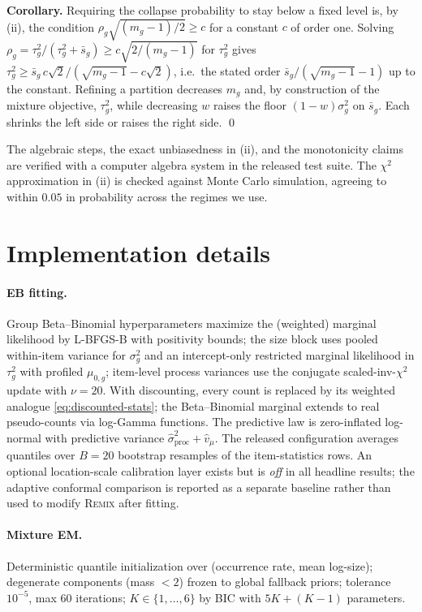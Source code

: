 \documentclass[twocolumn,10pt]{article}
\theoremstyle{definition}
\newcommand{\REMIX}{\textsc{Remix}}
\begin{document}
\textbf{Corollary.} Requiring the collapse probability to stay below a
fixed level is, by (ii), the condition $\rho_g\sqrt{(m_g-1)/2}\ge c$ for
a constant $c$ of order one. Solving
$\rho_g=\tau_g^2/(\tau_g^2+\bar s_g)\ge c\sqrt{2/(m_g-1)}$ for
$\tau_g^2$ gives
$\tau_g^2\ge\bar s_g\,c\sqrt{2}/(\sqrt{m_g-1}-c\sqrt2)$, i.e.\ the
stated order $\bar s_g/(\sqrt{m_g-1}-1)$ up to the constant. Refining a
partition decreases $m_g$ and, by construction of the mixture objective,
$\tau_g^2$, while decreasing $w$ raises the floor $(1-w)\sigma_g^2$ on
$\bar s_g$. Each shrinks the left side or raises the right side. \qed

The algebraic steps, the exact unbiasedness in (ii), and the monotonicity
claims are verified with a computer algebra system in
the released test suite. The $\chi^2$ approximation in (ii) is checked
against Monte Carlo simulation, agreeing to within $0.05$ in probability
across the regimes we use.

\section{Implementation details}\label{app:implementation}

\paragraph{EB fitting.} Group Beta--Binomial hyperparameters maximize the
(weighted) marginal likelihood by L-BFGS-B with positivity bounds; the
size block uses pooled within-item variance for $\sigma^2_g$ and an
intercept-only restricted marginal likelihood in $\tau^2_g$ with profiled
$\mu_{0,g}$; item-level process variances use the conjugate
scaled-inv-$\chi^2$ update with $\nu{=}20$. With discounting, every count
is replaced by its weighted analogue \eqref{eq:discounted-stats}; the
Beta--Binomial marginal extends to real pseudo-counts via log-Gamma
functions. The predictive law is zero-inflated log-normal with predictive
variance $\hat\sigma^2_{\mathrm{proc}}+\hat v_\mu$. The released
configuration averages quantiles over $B{=}20$ bootstrap resamples of the
item-statistics rows. An optional location-scale calibration layer exists
but is \emph{off} in all headline results; the adaptive conformal
comparison is reported as a separate baseline rather than used to modify
\REMIX{} after fitting.

\paragraph{Mixture EM.} Deterministic quantile initialization over
(occurrence rate, mean log-size); degenerate components (mass $<2$)
frozen to global fallback priors; tolerance $10^{-5}$, max 60 iterations;
$K\in\{1,\dots,6\}$ by BIC with $5K+(K-1)$ parameters.
\end{document}
